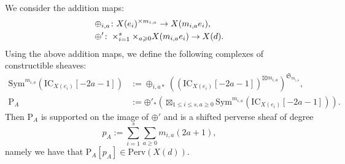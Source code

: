 \documentclass [11pt,oneside,a4paper,mathscr]{amsart}
\theoremstyle{definition}
\renewcommand{\leq}{\leqslant}
\renewcommand{\geq}{\geqslant}
\begin{document}
We consider the addition maps:
\begin{align}
    &\oplus_{i,a}\colon X(e_i)^{\times m_{i,a}}\to X(m_{i,a}e_i),\\
    &\notag \oplus'\colon \times_{i=1}^s\times_{a\geq 0} X(m_{i,a}e_i)\to X(d).
\end{align}
Using the above addition maps, we 
define the following complexes of 
constructible sheaves:
\begin{align*}
    \mathrm{Sym}^{m_{i,a}}\left(\mathrm{IC}_{X(e_i)}[-2a-1]\right)&:=\oplus_{i,a *} \left(\left(\mathrm{IC}_{X(e_i)}[-2a-1]\right)^{\boxtimes m_{i,a}}\right)^{\mathfrak{S}_{m_{i,a}}},\\
\mathrm{P}_A&:=\oplus'_*\left(\boxtimes_{1\leq i\leq s, a\geq 0} \mathrm{Sym}^{m_{i,a}} \left(\mathrm{IC}_{X(e_i)}[-2a-1]\right)\right).
\end{align*}
Then $\mathrm{P}_A$ is supported on the image of $\oplus'$ and is a shifted perverse sheaf of degree
\[p_A:=\sum_{i=1}^s\sum_{a\geq 0}m_{i,a}(2a+1),\] 
namely we have that $\mathrm{P}_A[p_A]\in \mathrm{Perv}(X(d))$.
\end{document}
